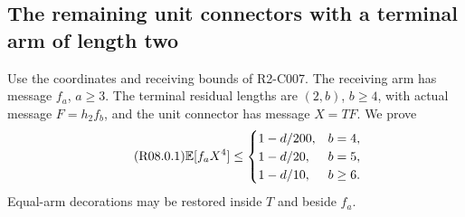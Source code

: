 \subsection{The remaining unit connectors with a terminal arm of length two}\label{proof:R2-C008}
Use the coordinates and receiving bounds of R2-C007. The
receiving arm has message $f_a$, $a\ge3$. The terminal residual lengths
are $(2,b)$, $b\ge4$, with actual message $F=h_2f_b$, and the unit
connector has message $X=TF$. We prove
\begin{equation}\tag{R08.0.1}\label{eq:R08:claims}
 \mathbb E[f_aX^4]\le
 \begin{cases}1-d/200,&b=4,\\1-d/20,&b=5,\\1-d/10,&b\ge6.
 \end{cases}
\end{equation}
Equal-arm decorations may be restored inside $T$ and beside $f_a$.

